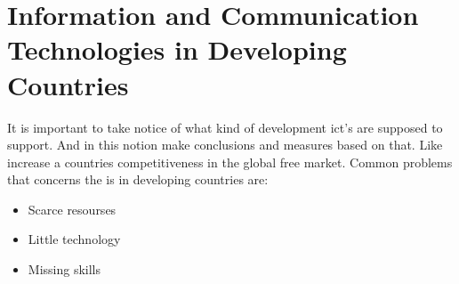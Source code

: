 \section{Information and Communication Technologies in Developing Countries}

It is important to take notice of what kind of development \gls{ict}'s are supposed to support.
And in this notion make conclusions and measures based on that.
Like increase a countries competitiveness in the global free market.
Common problems that concerns the \gls{is} in developing countries are:

\begin{itemize}
\item Scarce resourses
\item Little technology
\item Missing skills
\end{itemize}

